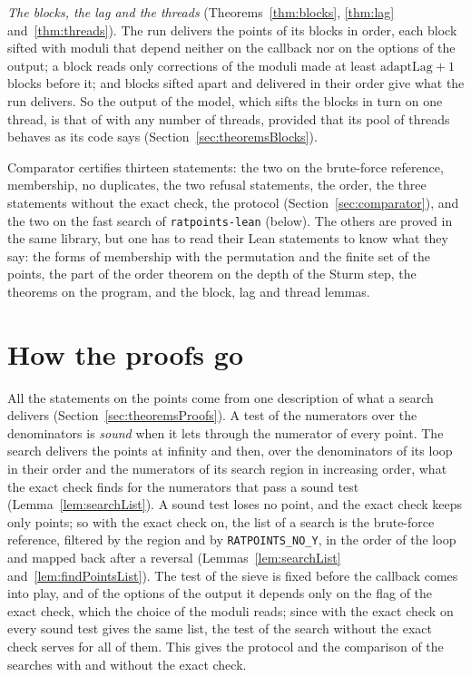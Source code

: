 \emph{The blocks, the lag and the threads} (Theorems~\ref{thm:blocks}, \ref{thm:lag}
and~\ref{thm:threads}). The run delivers the points of its blocks in order, each block sifted with
moduli that depend neither on the callback nor on the options of the output; a block reads only
corrections of the moduli made at least $\mathrm{adaptLag} + 1$ blocks before it; and blocks sifted
apart and delivered in their order give what the run delivers. So the output of the model, which
sifts the blocks in turn on one thread, is that of \ratpoints{} with any number of threads, provided
that its pool of threads behaves as its code says (Section~\ref{sec:theoremsBlocks}).

Comparator certifies thirteen statements: the two on the brute-force reference, membership, no
duplicates, the two refusal statements, the order, the three statements without the exact check, the
protocol (Section~\ref{sec:comparator}), and the two on the fast search of \verb|ratpoints-lean|
(below). The others are proved in the same library, but one has to read their Lean statements to
know what they say: the forms of membership with the permutation and the finite set of the points,
the part of the order theorem on the depth of the Sturm step, the theorems on the program, and the
block, lag and thread lemmas.

\section{How the proofs go}\label{sec:overviewProofs}

All the statements on the points come from one description of what a search delivers
(Section~\ref{sec:theoremsProofs}). A test of the numerators over the denominators is \emph{sound}
when it lets through the numerator of every point. The search delivers the points at infinity and
then, over the denominators of its loop in their order and the numerators of its search region in
increasing order, what the exact check finds for the numerators that pass a sound test
(Lemma~\ref{lem:searchList}). A sound test loses no point, and the exact check keeps only points; so
with the exact check on, the list of a search is the brute-force reference, filtered by the region
and by \verb|RATPOINTS_NO_Y|, in the order of the loop and mapped back after a reversal
(Lemmas~\ref{lem:searchList} and~\ref{lem:findPointsList}). The test of the sieve is fixed before
the callback comes into play, and of the options of the output it depends only on the flag of the
exact check, which the choice of the moduli reads; since with the exact check on every sound test
gives the same list, the test of the search without the exact check serves for all of them. This
gives the protocol and the comparison of the searches with and without the exact check.

